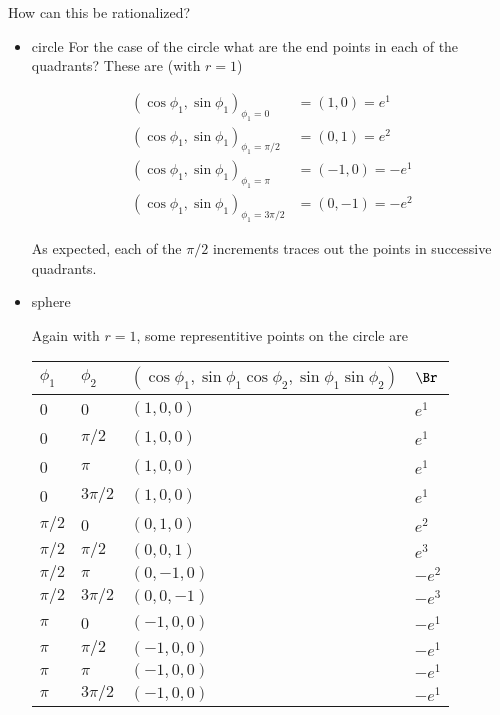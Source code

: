 \documentclass{article}
\begin{document}
How can this be rationalized?

\begin{itemize}
\item circle
For the case of the circle what are the end points in each of the quadrants?  These are (with $r=1$)

\begin{align*}
(\cos\phi_1, \sin\phi_1)_{\phi_1 = 0}        &= ( 1, 0 ) = e^1 \\
(\cos\phi_1, \sin\phi_1)_{\phi_1 = \pi/2}    &= ( 0, 1 ) = e^2 \\
(\cos\phi_1, \sin\phi_1)_{\phi_1 = \pi}      &= ( -1, 0 ) = -e^1 \\
(\cos\phi_1, \sin\phi_1)_{\phi_1 = 3\pi/2}   &= ( 0, -1 ) = -e^2
\end{align*}

As expected, each of the $\pi/2$ increments traces out the points in successive quadrants.

\item sphere

Again with $r=1$, some representitive points on the circle are

\begin{tabular}{|l|l|l|l|}
\hline
$\phi_1$ & $\phi_2$ & $(\cos\phi_1, \sin\phi_1 \cos\phi_2, \sin\phi_1 \sin\phi_2)$ & $\Br$ \\
\hline
0 & 0 & $(1,0,0)$ & $e^1$ \\
0 & $\pi/2$ &  $(1,0,0)$ & $e^1$ \\
0 & $\pi$ &  $(1,0,0)$ & $e^1$ \\
0 & $3\pi/2$ &  $(1,0,0)$ & $e^1$ \\
%
%
%
$\pi/2$ & 0 &  $(0,1,0)$ & $e^2$ \\
$\pi/2$ & $\pi/2$ &  $(0,0,1)$ & $e^3$ \\
$\pi/2$ & $\pi$ &  $(0,-1,0)$ & $-e^2$ \\
$\pi/2$ & $3\pi/2$ &  $(0,0,-1)$ & $-e^3$ \\
%
%
%
$\pi$ & 0 &  $(-1,0,0)$ & $-e^1$ \\
$\pi$ & $\pi/2$ &  $(-1,0,0)$ & $-e^1$ \\
$\pi$ & $\pi$ &  $(-1,0,0)$ & $-e^1$ \\
$\pi$ & $3\pi/2$ & $(-1,0,0)$ & $-e^1$ \\
\hline
\end{tabular}


\end{itemize}
\end{document}

